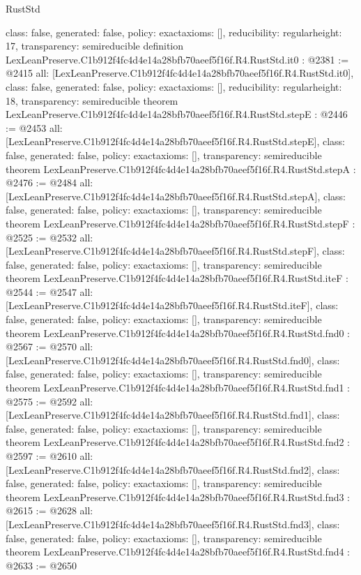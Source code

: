 \begin{lexlean}{RustStd}
\begin{coremodule}
{  class: false,
  generated: false,
  policy: exact{axioms: []},
  reducibility: regular{height: 17},
  transparency: semireducible
}
definition LexLeanPreserve.C1b912f4fc4d4e14a28bfb70aeef5f16f.R4.RustStd.it0 : @2381 := @2415 {
  all: [LexLeanPreserve.C1b912f4fc4d4e14a28bfb70aeef5f16f.R4.RustStd.it0],
  class: false,
  generated: false,
  policy: exact{axioms: []},
  reducibility: regular{height: 18},
  transparency: semireducible
}
theorem LexLeanPreserve.C1b912f4fc4d4e14a28bfb70aeef5f16f.R4.RustStd.stepE : @2446 := @2453 {
  all: [LexLeanPreserve.C1b912f4fc4d4e14a28bfb70aeef5f16f.R4.RustStd.stepE],
  class: false,
  generated: false,
  policy: exact{axioms: []},
  transparency: semireducible
}
theorem LexLeanPreserve.C1b912f4fc4d4e14a28bfb70aeef5f16f.R4.RustStd.stepA : @2476 := @2484 {
  all: [LexLeanPreserve.C1b912f4fc4d4e14a28bfb70aeef5f16f.R4.RustStd.stepA],
  class: false,
  generated: false,
  policy: exact{axioms: []},
  transparency: semireducible
}
theorem LexLeanPreserve.C1b912f4fc4d4e14a28bfb70aeef5f16f.R4.RustStd.stepF : @2525 := @2532 {
  all: [LexLeanPreserve.C1b912f4fc4d4e14a28bfb70aeef5f16f.R4.RustStd.stepF],
  class: false,
  generated: false,
  policy: exact{axioms: []},
  transparency: semireducible
}
theorem LexLeanPreserve.C1b912f4fc4d4e14a28bfb70aeef5f16f.R4.RustStd.iteF : @2544 := @2547 {
  all: [LexLeanPreserve.C1b912f4fc4d4e14a28bfb70aeef5f16f.R4.RustStd.iteF],
  class: false,
  generated: false,
  policy: exact{axioms: []},
  transparency: semireducible
}
theorem LexLeanPreserve.C1b912f4fc4d4e14a28bfb70aeef5f16f.R4.RustStd.fnd0 : @2567 := @2570 {
  all: [LexLeanPreserve.C1b912f4fc4d4e14a28bfb70aeef5f16f.R4.RustStd.fnd0],
  class: false,
  generated: false,
  policy: exact{axioms: []},
  transparency: semireducible
}
theorem LexLeanPreserve.C1b912f4fc4d4e14a28bfb70aeef5f16f.R4.RustStd.fnd1 : @2575 := @2592 {
  all: [LexLeanPreserve.C1b912f4fc4d4e14a28bfb70aeef5f16f.R4.RustStd.fnd1],
  class: false,
  generated: false,
  policy: exact{axioms: []},
  transparency: semireducible
}
theorem LexLeanPreserve.C1b912f4fc4d4e14a28bfb70aeef5f16f.R4.RustStd.fnd2 : @2597 := @2610 {
  all: [LexLeanPreserve.C1b912f4fc4d4e14a28bfb70aeef5f16f.R4.RustStd.fnd2],
  class: false,
  generated: false,
  policy: exact{axioms: []},
  transparency: semireducible
}
theorem LexLeanPreserve.C1b912f4fc4d4e14a28bfb70aeef5f16f.R4.RustStd.fnd3 : @2615 := @2628 {
  all: [LexLeanPreserve.C1b912f4fc4d4e14a28bfb70aeef5f16f.R4.RustStd.fnd3],
  class: false,
  generated: false,
  policy: exact{axioms: []},
  transparency: semireducible
}
theorem LexLeanPreserve.C1b912f4fc4d4e14a28bfb70aeef5f16f.R4.RustStd.fnd4 : @2633 := @2650 {
}
\end{coremodule}
\end{lexlean}
